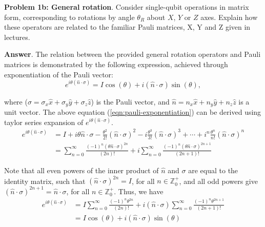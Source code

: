 \textbf{Problem 1b: General rotation}. Consider single-qubit operations in matrix form, corresponding to rotations by angle $\theta_R$ about $X$, $Y$ or $Z$ axes.
Explain how these operators are related to the familiar Pauli matrices, X, Y and Z given in lectures.


\textbf{Answer}. The relation between the provided general rotation operators and Pauli matrices is demonstrated by the following expression, achieved through exponentiation of the Pauli vector:
\begin{equation}
	\label{eqn:pauli-exponentiation}
	e^{i\theta(\hat{n} \cdot \sigma)} = I \cos(\theta) + i(\hat{n} \cdot \sigma) \sin(\theta),
\end{equation}

where ($\sigma = \sigma_x\hat{x} + \sigma_y\hat{y} + \sigma_z\hat{z}$) is the Pauli vector, and $\hat{n} = n_x\hat{x} + n_y\hat{y} + n_z\hat{z}$ is a unit vector. 
The above equation (\ref{eqn:pauli-exponentiation}) can be derived using  taylor series expansion of $e^{i\theta(\hat{n} \cdot \sigma)}$.
\begin{align*}
	e^{i\theta(\hat{n} \cdot \sigma)} &= I + i\theta\hat{n}\cdot\sigma  -\frac{\theta^2}{2!}(\hat{n}\cdot\sigma)^2 - i\frac{\theta^3}{3!}(\hat{n}\cdot\sigma)^3 + \dotsb + i^n\frac{\theta^n}{n!}(\hat{n}\cdot\sigma)^n \\
	&= \sum^{\infty}_{n=0} \frac{(-1)^n(\theta\hat{n}\cdot\sigma)^{2n}}{(2n)!} + i\sum^{\infty}_{n=0} \frac{(-1)^n(\theta\hat{n}\cdot\sigma)^{2n+1}}{(2n+1)!}
\end{align*}

Note that all even powers of the inner product of $\hat{n}$ and $\sigma$ are equal to the identity matrix, such that $(\hat{n} \cdot \sigma)^{2n} = I$, for all $n \in \mathbb{Z}^+_0$, and all odd powers give $(\hat{n} \cdot \sigma)^{2n+1} = \hat{n} \cdot \sigma$, for all $n \in \mathbb{Z}^+_0$.
Thus, we have
\begin{align*}
	e^{i\theta(\hat{n} \cdot \sigma)} &= I\sum^{\infty}_{n=0} \frac{(-1)^n\theta^{2n}}{(2n)!} + i(\hat{n}\cdot\sigma)\sum^{\infty}_{n=0} \frac{(-1)^n\theta^{2n+1}}{(2n+1)!} \\
	&= I \cos(\theta) + i(\hat{n} \cdot \sigma) \sin(\theta)
\end{align*}

